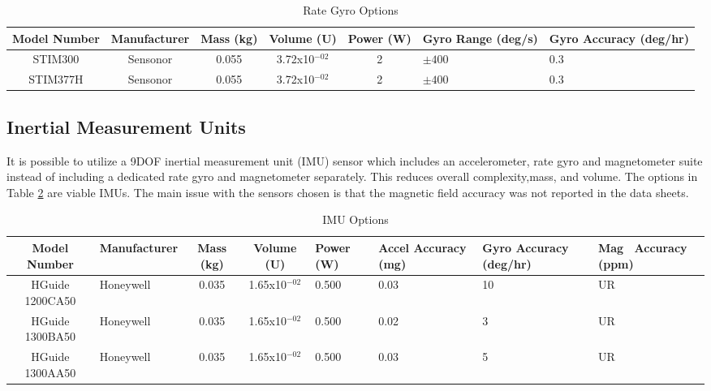 \documentclass[conf]{new-aiaa}
\begin{document}
\begin{table}[H]
 \centering
 \caption{Rate Gyro Options}
 \begin{tabular}[t]{|c|c|c|c|c|p{1.5cm}|p{1.5cm}|}
    \hline
 \textbf{Model Number} & \textbf{Manufacturer} & \textbf{Mass (kg)} & \textbf{Volume (U)} & \textbf{Power (W)} & \textbf{Gyro Range (deg/s)} & \textbf{Gyro Accuracy (deg/hr)} \\
    \hline
    STIM300 \cite{STIM300} & Sensonor & 0.055 & 3.72x10$^{-02}$ & 2 & $\pm 400$ & 0.3 \\
    \hline
    STIM377H \cite{STIM377H} & Sensonor & 0.055 & 3.72x10$^{-02}$ & 2 & $\pm400$ & 0.3 \\
    \hline
\end{tabular}
\label{t:RATE_GYRO}
\end{table}

\subsection{Inertial Measurement Units}
It is possible to utilize a 9DOF inertial measurement unit (IMU) sensor which includes an accelerometer, rate gyro and magnetometer suite instead of including a dedicated rate gyro and magnetometer separately. This reduces overall complexity,mass, and volume. The options in Table \ref{t:IMU} are viable IMUs. The main issue with the sensors chosen is that the magnetic field accuracy was not reported in the data sheets.

\begin{table}[H]
 \centering
 \caption{IMU Options}
 \begin{tabular}[t]{|c|p{2.0cm}|c|c|p{1.0cm}|p{1.4cm}|p{1.4cm}|p{1.4cm}|}
    \hline
    \textbf{Model Number} & \textbf{Manufacturer} & \textbf{Mass (kg)} & \textbf{Volume (U)} & \textbf{Power (W)} & \textbf{Accel Accuracy (mg)} & \textbf{Gyro Accuracy (deg/hr)} &  \textbf{Mag \ Accuracy (ppm)} \\
    \hline
    HGuide 1200CA50 \cite{HGuide1200CA50} & Honeywell & 0.035 & 1.65x10$^{-02}$ & 0.500 & 0.03 & 10 & UR \\
    \hline
    HGuide 1300BA50 \cite{HGuide1300BA50} & Honeywell & 0.035 & 1.65x10$^{-02}$ & 0.500 & 0.02 & 3 & UR \\
    \hline
    HGuide 1300AA50 \cite{HGuide1300BA50} & Honeywell & 0.035 & 1.65x10$^{-02}$ & 0.500 & 0.03 & 5 & UR \\
    \hline
\end{tabular}
\label{t:IMU}
\end{table}
\end{document}
